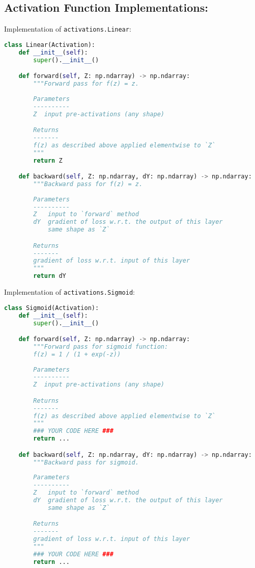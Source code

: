 \subsection{Activation Function Implementations:}

Implementation of \texttt{activations.Linear}:

\begin{lstlisting}[language=Python]
class Linear(Activation):
    def __init__(self):
        super().__init__()

    def forward(self, Z: np.ndarray) -> np.ndarray:
        """Forward pass for f(z) = z.
        
        Parameters
        ----------
        Z  input pre-activations (any shape)

        Returns
        -------
        f(z) as described above applied elementwise to `Z`
        """
        return Z

    def backward(self, Z: np.ndarray, dY: np.ndarray) -> np.ndarray:
        """Backward pass for f(z) = z.
        
        Parameters
        ----------
        Z   input to `forward` method
        dY  gradient of loss w.r.t. the output of this layer
            same shape as `Z`

        Returns
        -------
        gradient of loss w.r.t. input of this layer
        """
        return dY

\end{lstlisting}

Implementation of \texttt{activations.Sigmoid}:

\begin{lstlisting}[language=Python]
class Sigmoid(Activation):
    def __init__(self):
        super().__init__()

    def forward(self, Z: np.ndarray) -> np.ndarray:
        """Forward pass for sigmoid function:
        f(z) = 1 / (1 + exp(-z))
        
        Parameters
        ----------
        Z  input pre-activations (any shape)

        Returns
        -------
        f(z) as described above applied elementwise to `Z`
        """
        ### YOUR CODE HERE ###
        return ...

    def backward(self, Z: np.ndarray, dY: np.ndarray) -> np.ndarray:
        """Backward pass for sigmoid.
        
        Parameters
        ----------
        Z   input to `forward` method
        dY  gradient of loss w.r.t. the output of this layer
            same shape as `Z`

        Returns
        -------
        gradient of loss w.r.t. input of this layer
        """
        ### YOUR CODE HERE ###
        return ...

\end{lstlisting}


